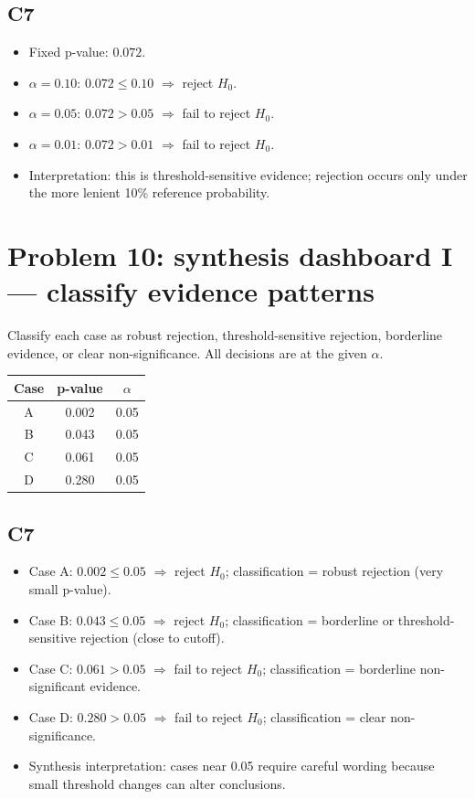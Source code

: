 \begin{ExamProblems}
\subsection*{C7}
\begin{itemize}
    \item Fixed p-value: \(0.072\).
    \item \(\alpha=0.10\): \(0.072\le 0.10\) \(\Rightarrow\) reject \(H_0\).
    \item \(\alpha=0.05\): \(0.072>0.05\) \(\Rightarrow\) fail to reject \(H_0\).
    \item \(\alpha=0.01\): \(0.072>0.01\) \(\Rightarrow\) fail to reject \(H_0\).
    \item Interpretation: this is threshold-sensitive evidence; rejection occurs only under the more lenient 10\% reference probability.
\end{itemize}

\item
\section{Problem 10: synthesis dashboard I --- classify evidence patterns}
Classify each case as robust rejection, threshold-sensitive rejection, borderline evidence, or clear non-significance.
All decisions are at the given \(\alpha\).

\begin{center}
\begin{tabular}{|c|c|c|}
\hline
Case & p-value & \(\alpha\) \\
\hline
A & 0.002 & 0.05 \\
B & 0.043 & 0.05 \\
C & 0.061 & 0.05 \\
D & 0.280 & 0.05 \\
\hline
\end{tabular}
\end{center}

\subsection*{C7}
\begin{itemize}
    \item Case A: \(0.002\le 0.05\) \(\Rightarrow\) reject \(H_0\); classification = robust rejection (very small p-value).
    \item Case B: \(0.043\le 0.05\) \(\Rightarrow\) reject \(H_0\); classification = borderline or threshold-sensitive rejection (close to cutoff).
    \item Case C: \(0.061>0.05\) \(\Rightarrow\) fail to reject \(H_0\); classification = borderline non-significant evidence.
    \item Case D: \(0.280>0.05\) \(\Rightarrow\) fail to reject \(H_0\); classification = clear non-significance.
    \item Synthesis interpretation: cases near 0.05 require careful wording because small threshold changes can alter conclusions.
\end{itemize}


\end{ExamProblems}
